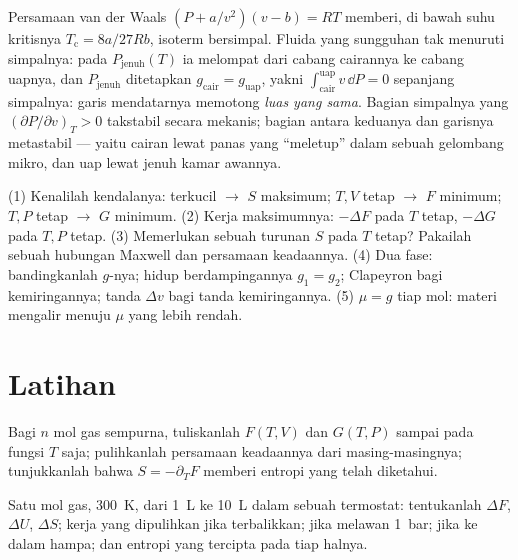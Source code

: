 \begin{remark}\label{rem:b2:thermodynamic-potentials:maxwellconstruction}
Persamaan van der Waals $(P + a/v^2)(v - b) = RT$ memberi, di bawah suhu
kritisnya $T_{\text{c}} = 8a/27Rb$, isoterm bersimpal. Fluida
yang sungguhan tak menuruti simpalnya: pada $P_{\text{jenuh}}(T)$ ia melompat dari
cabang cairannya ke cabang uapnya, dan $P_{\text{jenuh}}$ ditetapkan $g_{\text{cair}}
= g_{\text{uap}}$, yakni $\int_{\text{cair}}^{\text{uap}}v\,\dd P = 0$ sepanjang
simpalnya: garis mendatarnya memotong \emph{luas yang sama}. Bagian
simpalnya yang $(\partial P/\partial v)_T > 0$ takstabil secara mekanis;
bagian antara keduanya dan garisnya metastabil --- yaitu cairan lewat panas
yang ``meletup'' dalam sebuah gelombang mikro, dan uap lewat jenuh
kamar awannya.
\end{remark}

\begin{method}\label{meth:b2:thermodynamic-potentials:method}
(1) Kenalilah kendalanya: terkucil $\to$ $S$ maksimum; $T,V$ tetap $\to$
$F$ minimum; $T,P$ tetap $\to$ $G$ minimum. (2) Kerja maksimumnya: $-\Delta F$ pada $T$
tetap, $-\Delta G$  pada $T,P$ tetap. (3) Memerlukan sebuah turunan
$S$ pada $T$ tetap? Pakailah sebuah hubungan Maxwell dan persamaan keadaannya.
(4) Dua fase: bandingkanlah $g$-nya; hidup berdampingannya $g_1 = g_2$; Clapeyron bagi
kemiringannya; tanda $\Delta v$ bagi tanda kemiringannya. (5)  $\mu = g$ tiap mol: materi mengalir menuju $\mu$ yang lebih rendah.
\end{method}

\section{Latihan}

\begin{exercise}[$\star$]\label{exo:b2:thermodynamic-potentials:1}
Bagi $n$ mol gas sempurna, tuliskanlah $F(T,V)$ dan $G(T,P)$ sampai pada
fungsi $T$ saja; pulihkanlah persamaan keadaannya dari masing-masingnya; tunjukkanlah
bahwa $S = -\partial_TF$ memberi entropi yang telah diketahui.
\end{exercise}

\begin{exercise}[$\star$]\label{exo:b2:thermodynamic-potentials:2}
Satu mol gas, \qty{300}{K}, dari \qty{1}{L} ke \qty{10}{L} dalam sebuah
termostat: tentukanlah $\Delta F$, $\Delta U$, $\Delta S$; kerja yang dipulihkan jika terbalikkan;
jika melawan \qty{1}{bar}; jika ke dalam hampa; dan entropi yang tercipta pada tiap
halnya.
\end{exercise}

